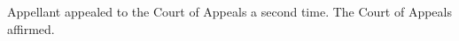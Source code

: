 \documentclass[12pt,\documentclassflag]{michiganCourtOfAppealsBrief}
\begin{document}
Appellant appealed to the Court of Appeals a second time. The Court of Appeals affirmed. 

\end{document}

